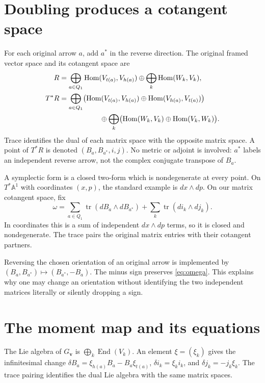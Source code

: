 \documentclass[11pt,a4paper]{article}
\numberwithin{equation}{section}
\theoremstyle{definition}
\newcommand{\A}{\mathbb A}
\newcommand{\End}{\operatorname{End}}
\newcommand{\Hom}{\operatorname{Hom}}
\newcommand{\tr}{\operatorname{tr}}
\newcommand{\vv}{\mathbf v}
\begin{document}
\section{Doubling produces a cotangent space}
\label{sec:doubling}

For each original arrow $a$, add $a^*$ in the reverse direction.
The original framed vector space and its cotangent space are
\begin{align*}
 R&=\bigoplus_{a\in Q_1}\Hom(V_{t(a)},V_{h(a)})
       \oplus\bigoplus_k\Hom(W_k,V_k),\\
 T^*R&=\bigoplus_{a\in Q_1}
 \bigl(\Hom(V_{t(a)},V_{h(a)})\oplus\Hom(V_{h(a)},V_{t(a)})\bigr)\\
 &\hspace{20mm}\oplus\bigoplus_k
 \bigl(\Hom(W_k,V_k)\oplus\Hom(V_k,W_k)\bigr).
\end{align*}
Trace identifies the dual of each matrix space with the opposite
matrix space. A point of $T^*R$ is denoted $(B_a,B_{a^*},i,j)$.
No metric or adjoint is involved: $a^*$ labels an independent
reverse arrow, not the complex conjugate transpose of $B_a$.

A symplectic form is a closed two-form which is nondegenerate
at every point. On $T^*\A^1$ with coordinates $(x,p)$, the
standard example is $dx\wedge dp$. On our matrix cotangent space,
fix
\begin{equation}\label{eq:omega}
 \omega=\sum_{a\in Q_1}\tr(dB_a\wedge dB_{a^*})
              +\sum_k\tr(di_k\wedge dj_k).
\end{equation}
In coordinates this is a sum of independent $dx\wedge dp$
terms, so it is closed and nondegenerate. The trace pairs the
original matrix entries with their cotangent partners.

Reversing the chosen orientation of an original arrow is
implemented by $(B_a,B_{a^*})\mapsto(B_{a^*},-B_a)$.
The minus sign preserves \eqref{eq:omega}. This explains why
one may change an orientation without identifying the two
independent matrices literally or silently dropping a sign.

\section{The moment map and its equations}
\label{sec:moment}

The Lie algebra of $G_\vv$ is $\bigoplus_k\End(V_k)$.
An element $\xi=(\xi_k)$ gives the infinitesimal change
$\delta B_a=\xi_{h(a)}B_a-B_a\xi_{t(a)}$,
$\delta i_k=\xi_ki_k$, and $\delta j_k=-j_k\xi_k$.
The trace pairing identifies the dual Lie algebra with the
same matrix spaces.
\end{document}
